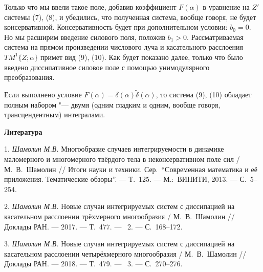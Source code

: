 Только что мы ввели такое поле, добавив коэффициент $F(\alpha)$ в
уравнение на $Z'$ системы (7), (8), и убедились, что полученная
система, вообще говоря, не будет консервативной. Консервативность
будет при дополнительном условии: $b_0=0$. Но мы расширим введение
силового поля, положив $b_1>0$. Рассматриваемая система на прямом
произведении числового луча и касательного расслоения
$TM^1\{Z;\alpha\}$ примет вид (9), (10). Как будет показано далее,
только что было введено диссипативное силовое поле с помощью
унимодулярного преобразования.

Если выполнено условие
$F(\alpha)=\delta(\alpha)\tilde{\delta}(\alpha)$, то система (9),
(10) обладает полным набором
"--- двумя (одним гладким и одним, вообще говоря, трансцендентным)
интегралами.



\smallskip \centerline {\bf Литература} \nopagebreak

1. {\it Шамолин М.В.} Многообразие случаев интегрируемости в динамике
маломерного и многомерного твёрдого тела в неконсервативном поле сил
/ М.~В.~Шамолин // Итоги науки и техники. Сер.~``Современная
математика и её приложения. Тематические обзоры''. --- Т.~125. ---
М.:~ВИНИТИ, 2013. --- С.~5--254.

2. {\it Шамолин М.В.} Новые случаи интегрируемых систем с диссипацией на
касательном расслоении трёхмерного многообразия / М.~В.~Шамолин //
Доклады РАН. --- 2017. --- Т.~477. --- \No~2. --- С.~168--172.

3. {\it Шамолин М.В.} Новые случаи интегрируемых систем с диссипацией на
касательном расслоении четырёхмерного многообразия / М.~В.~Шамолин
// Доклады РАН. --- 2018. --- Т.~479. --- \No~3. --- С.~270--276.


